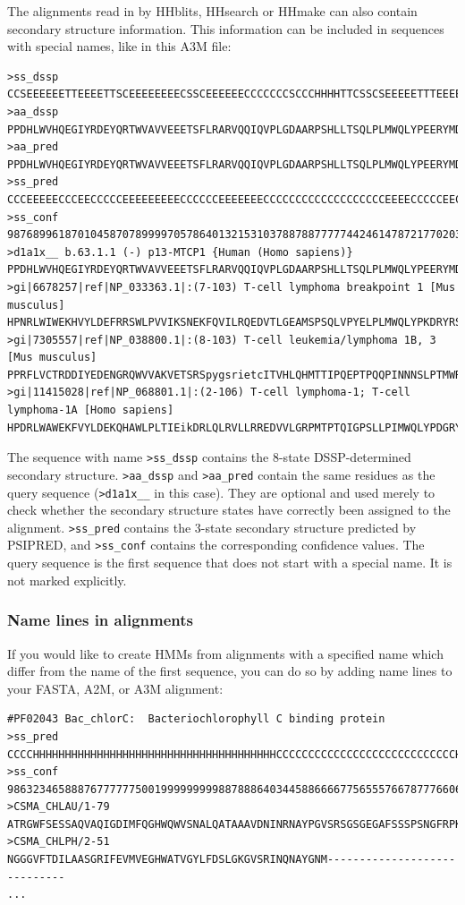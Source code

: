 \documentclass[11pt,a4paper]{article}
\begin{document}
The alignments read in by HHblits, HHsearch or HHmake can also contain secondary structure 
information. This information can be included in sequences with special names, 
like in this A3M file:

\scriptsize
\begin{verbatim}
>ss_dssp
CCSEEEEEETTEEEETTSCEEEEEEEECSSCEEEEEECCCCCCCSCCCHHHHTTCSSCSEEEEETTTEEEETTSC
>aa_dssp
PPDHLWVHQEGIYRDEYQRTWVAVVEEETSFLRARVQQIQVPLGDAARPSHLLTSQLPLMWQLYPEERYMDNNSR
>aa_pred 
PPDHLWVHQEGIYRDEYQRTWVAVVEEETSFLRARVQQIQVPLGDAARPSHLLTSQLPLMWQLYPEERYMDNNSR
>ss_pred 
CCCEEEEECCCEECCCCCEEEEEEEEECCCCCCEEEEEEECCCCCCCCCCCCCCCCCCCEEEECCCCCEECCCCC
>ss_conf 
987689961870104587078999970578640132153103788788777774424614787217702035631
>d1a1x__ b.63.1.1 (-) p13-MTCP1 {Human (Homo sapiens)}
PPDHLWVHQEGIYRDEYQRTWVAVVEEETSFLRARVQQIQVPLGDAARPSHLLTSQLPLMWQLYPEERYMDNNSR
>gi|6678257|ref|NP_033363.1|:(7-103) T-cell lymphoma breakpoint 1 [Mus musculus]
HPNRLWIWEKHVYLDEFRRSWLPVVIKSNEKFQVILRQEDVTLGEAMSPSQLVPYELPLMWQLYPKDRYRSCDSM
>gi|7305557|ref|NP_038800.1|:(8-103) T-cell leukemia/lymphoma 1B, 3 [Mus musculus]
PPRFLVCTRDDIYEDENGRQWVVAKVETSRSpygsrietcITVHLQHMTTIPQEPTPQQPINNNSLPTMWRLESMNTYTGTDGT
>gi|11415028|ref|NP_068801.1|:(2-106) T-cell lymphoma-1; T-cell lymphoma-1A [Homo sapiens]
HPDRLWAWEKFVYLDEKQHAWLPLTIEikDRLQLRVLLRREDVVLGRPMTPTQIGPSLLPIMWQLYPDGRYRSSDSS
\end{verbatim}\normalsize

The sequence with name \verb`>ss_dssp` contains the 8-state DSSP-determined secondary
structure. \verb`>aa_dssp` and \verb`>aa_pred` contain the same residues as the query 
sequence (\verb`>d1a1x__` in this case). They are optional and used merely to check whether the 
secondary structure states have correctly been assigned to the alignment. \verb`>ss_pred` 
contains the 3-state secondary structure predicted by PSIPRED, and \verb`>ss_conf`
 contains the corresponding confidence values. The query sequence is the first sequence that 
does not start with a special name. It is not marked explicitly.


\subsubsection*{Name lines in alignments}

If you would like to create HMMs from alignments with a specified name which differ 
from the name of the first sequence, you can do so by adding name lines to 
your FASTA, A2M, or A3M alignment:

\scriptsize
\begin{verbatim}
#PF02043 Bac_chlorC:  Bacteriochlorophyll C binding protein
>ss_pred
CCCCHHHHHHHHHHHHHHHHHHHHHHHHHHHHHHHHHHHHHHCCCCCCCCCCCCCCCCCCCCCCCCCCCCHHHHHHHCC
>ss_conf
9863234658887677777750019999999998878886403445886666775655576678777660667633039
>CSMA_CHLAU/1-79
ATRGWFSESSAQVAQIGDIMFQGHWQWVSNALQATAAAVDNINRNAYPGVSRSGSGEGAFSSSPSNGFRPKRIRSRFNR
>CSMA_CHLPH/2-51
NGGGVFTDILAASGRIFEVMVEGHWATVGYLFDSLGKGVSRINQNAYGNM-----------------------------
...
\end{verbatim}\normalsize
\end{document}
